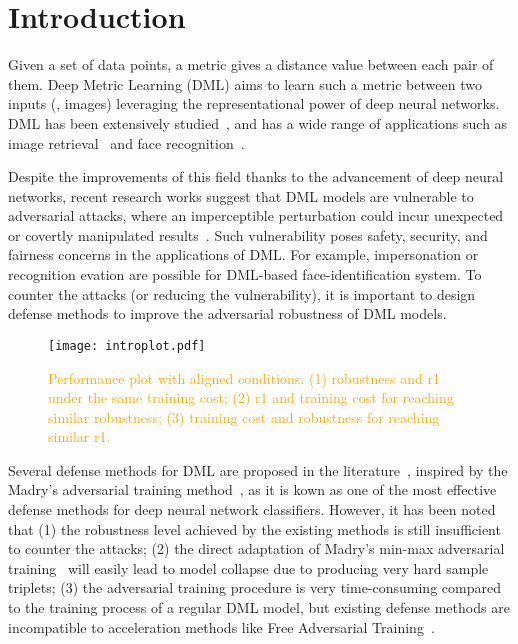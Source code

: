 \documentclass[10pt,twocolumn,letterpaper]{article}
\newcommand{\oo}[1]{\textcolor{orange}{#1}}
\begin{document}
\section{Introduction}
\label{sec:1}


Given a set of data points, a metric gives a distance value between each pair
of them.
%
Deep Metric Learning (DML) aims to learn such a metric between two inputs (\eg,
images) leveraging the representational power of deep neural networks.
%
DML has been extensively studied~\cite{revisiting}, and has a
wide range of applications such
as image retrieval~\cite{imagesim2} and face recognition~\cite{facenet,domainface}.

Despite the improvements of this field thanks to the advancement of deep neural
networks, recent research works suggest that DML models are vulnerable to
adversarial attacks, where an imperceptible perturbation could incur unexpected
or covertly manipulated results~\cite{advrank,advorder}.
%
Such vulnerability poses safety, security, and fairness concerns in the
applications of DML.
%
For example, impersonation or recognition evation are possible for DML-based
face-identification system.
%
To counter the attacks (or reducing the vulnerability), it is important to
design defense methods to improve the adversarial robustness of DML models.

\begin{figure}[t]
	\texttt{[image: introplot.pdf]}
	\caption{\oo{Performance plot with aligned conditions.
	(1) robustness and r1 under the same training cost;
	(2) r1 and training cost for reaching similar robustness;
	(3) training cost and robustness for reaching similar r1.}}
	\label{fig:introplot}
\end{figure}

Several defense methods for DML are proposed in the
literature~\cite{advrank,robrank}, inspired by the Madry's adversarial training
method~\cite{madry}, as it is kown as one of the most effective defense methods
for deep neural network classifiers.
%
However, it has been noted that
%
(1) the robustness level achieved by the existing methods is still insufficient
to counter the attacks;
%
(2) the direct adaptation of Madry's min-max adversarial training~\cite{madry} will easily
lead to model collapse due to producing very hard sample triplets;
%
(3) the adversarial training procedure is very time-consuming compared to
the training process of a regular DML model, but existing defense methods
are incompatible to acceleration methods like Free Adversarial Training~\cite{freeat}.
\end{document}
